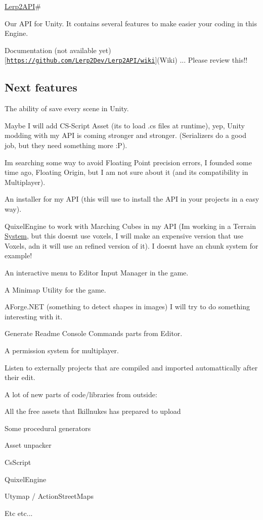 \hyperlink{namespace_lerp2_a_p_i}{Lerp2\+A\+PI}\#

Our A\+PI for Unity. It contains several features to make easier your coding in this Engine.

Documentation (not available yet) \mbox{[}\href{https://github.com/Lerp2Dev/Lerp2API/wiki}{\tt https\+://github.\+com/\+Lerp2\+Dev/\+Lerp2\+A\+P\+I/wiki}\mbox{]}(Wiki) ... Please review this!!

\subsection*{Next features}

The ability of save every scene in Unity.

Maybe I will add C\+S-\/\+Script Asset (it\textquotesingle{}s to load .cs files at runtime), yep, Unity modding with my A\+PI is coming stronger and stronger. (Serializers do a good job, but they need something more \+:P).

I\textquotesingle{}m searching some way to avoid Floating Point precision errors, I founded some time ago, Floating Origin, but I am not sure about it (and it\textquotesingle{}s compatibility in Multiplayer).

An installer for my A\+PI (this will use to install the A\+PI in your projects in a easy way).

Quixel\+Engine to work with Marching Cubes in my A\+PI (I\textquotesingle{}m working in a Terrain \hyperlink{namespace_system}{System}, but this doesn\textquotesingle{}t use voxels, I will make an expensive version that use Voxels, adn it will use an refined version of it). I doesn\textquotesingle{}t have an chunk system for example!

An interactive menu to Editor Input Manager in the game.

A Minimap Utility for the game.

A\+Forge.\+N\+ET (something to detect shapes in images) I will try to do something interesting with it.

Generate Readme Console Commands parts from Editor.

A permission system for multiplayer.

Listen to externally projects that are compiled and imported automattically after their edit.

A lot of new parts of code/libraries from outside\+:


\begin{DoxyItemize}
\item All the free assets that Ikillnukes has prepared to upload
\item Some procedural generators
\item Asset unpacker
\item Cs\+Script
\item Quixel\+Engine
\item Utymap / Action\+Street\+Maps
\item Etc etc...
\end{DoxyItemize}

